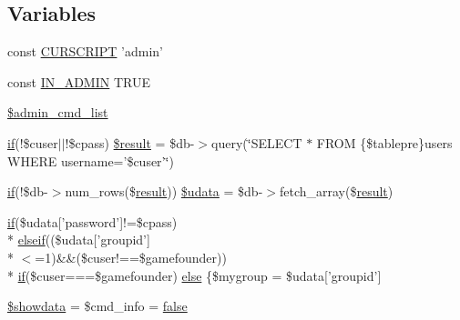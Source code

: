 \subsection*{Variables}
\begin{DoxyCompactItemize}
\item 
const \hyperlink{admin_8php_a39c39f525eceb86cabc338804f230e80}{C\+U\+R\+S\+C\+R\+I\+P\+T} 'admin'
\item 
const \hyperlink{admin_8php_ad49472b0cdee543164375bf133a537f1}{I\+N\+\_\+\+A\+D\+M\+I\+N} T\+R\+U\+E
\item 
\hyperlink{admin_8php_ae92b67aae844652bbcfd672d72221edf}{\$admin\+\_\+cmd\+\_\+list}
\item 
\hyperlink{login__old_8php_a4ac1118c2e44c513a674bc1793ba6c90}{if}(!\$cuser$\vert$$\vert$!\$cpass) \hyperlink{admin_8php_aa26a75c10464e039aa68f93507070136}{\$result} = \$db-\/$>$query(\char`\"{}S\+E\+L\+E\+C\+T $\ast$ F\+R\+O\+M \{\$tablepre\}users W\+H\+E\+R\+E username='\$cuser'\char`\"{})
\item 
\hyperlink{login__old_8php_a4ac1118c2e44c513a674bc1793ba6c90}{if}(!\$db-\/$>$num\+\_\+rows(\$\hyperlink{templates_2install_8php_abdecde238169a1e34f68354fc9968af0}{result})) \hyperlink{admin_8php_aa64a6e7c321a5fc5c5089fc201f285cb}{\$udata} = \$db-\/$>$fetch\+\_\+array(\$\hyperlink{templates_2install_8php_abdecde238169a1e34f68354fc9968af0}{result})
\item 
\hyperlink{login__old_8php_a4ac1118c2e44c513a674bc1793ba6c90}{if}(\$udata\mbox{[}'password'\mbox{]}!=\$cpass) \\*
\hyperlink{urlist_8php_a77f52b43f81ed05a41b68c2161789055}{elseif}((\$udata\mbox{[}'groupid'\mbox{]}\\*
$<$=1)\&\&(\$cuser!==\$gamefounder)) \\*
\hyperlink{login__old_8php_a4ac1118c2e44c513a674bc1793ba6c90}{if}(\$cuser===\$gamefounder) \hyperlink{admin_8php_af7e27d834f9bcc6589efcd2bf1d9ff80}{else} \{\$mygroup = \$udata\mbox{[}'groupid'\mbox{]}
\item 
\hyperlink{admin_8php_afb788491cc92566772efe4972c071c1d}{\$showdata} = \$cmd\+\_\+info = \hyperlink{1__chat_8tpl_8php_a5df37b7f02e5cdc7d9412b7f872b8e01}{false}
\end{DoxyCompactItemize}


